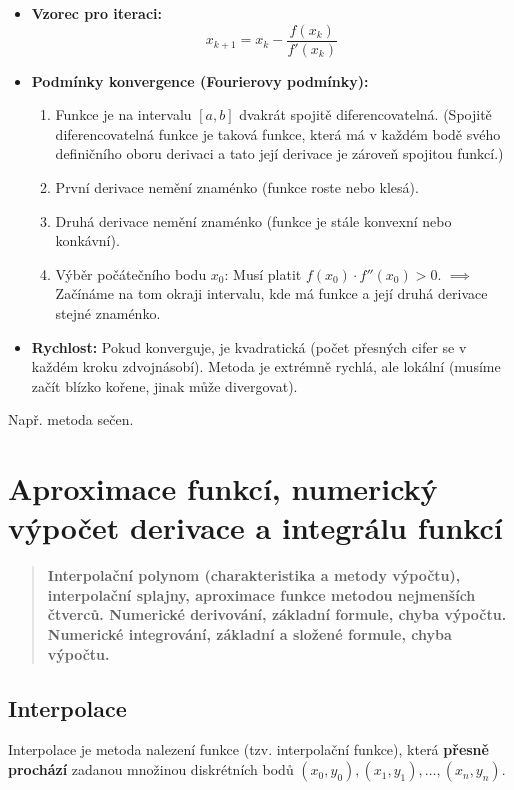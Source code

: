 \begin{description}
    \begin{itemize}
        \item \textbf{Vzorec pro iteraci:} 
        \[ x_{k+1} = x_k - \frac{f(x_k)}{f'(x_k)} \]
        \item \textbf{Podmínky konvergence (Fourierovy podmínky):} 
        \begin{enumerate}
            \item Funkce je na intervalu $[a, b]$ dvakrát spojitě diferencovatelná. (Spojitě diferencovatelná funkce je taková funkce, která má v každém bodě svého definičního oboru derivaci a tato její derivace je zároveň spojitou funkcí.)
            \item První derivace nemění znaménko (funkce roste nebo klesá).
            \item Druhá derivace nemění znaménko (funkce je stále konvexní nebo konkávní).
            \item Výběr počátečního bodu $x_0$: Musí platit $f(x_0) \cdot f''(x_0) > 0$. $\implies$ Začínáme na tom okraji intervalu, kde má funkce a její druhá derivace stejné znaménko.
        \end{enumerate}
        \item \textbf{Rychlost:} Pokud konverguje, je kvadratická (počet přesných cifer se v každém kroku zdvojnásobí). Metoda je extrémně rychlá, ale lokální (musíme začít blízko kořene, jinak může divergovat).
    \end{itemize}
    \item[Další:] Např. metoda sečen.
\end{description}

\newpage

\section{Aproximace funkcí, numerický výpočet derivace a integrálu funkcí}
\begin{quote}
    \textbf{Interpolační polynom (charakteristika a metody výpočtu), interpolační splajny, aproximace funkce metodou nejmenších čtverců. Numerické derivování, základní formule, chyba výpočtu. Numerické integrování, základní a složené formule, chyba výpočtu.}
\end{quote}

\subsection{Interpolace}
Interpolace je metoda nalezení funkce (tzv. interpolační funkce), která \textbf{přesně prochází} zadanou množinou diskrétních bodů $(x_0, y_0), (x_1, y_1), \dots, (x_n, y_n)$. 

